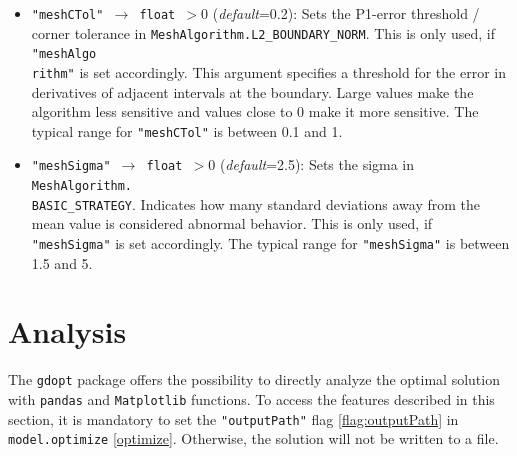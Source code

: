 \documentclass[12pt]{article}
\begin{document}
\begin{mdframed}[backgroundcolor=gray!10, roundcorner=10pt,
		linewidth=1pt]
\begin{itemize}
		      \label{flag:meshCTol}
		\item \texttt{"meshCTol" $\rightarrow$ float $> 0$}
		      (\emph{default}=0.2): Sets the P1-error threshold / corner tolerance in
		      \texttt{MeshAlgorithm.L2\_BOUNDARY\_NORM}. This is only used, if
		      \texttt{"meshAlgo\\rithm"} is set accordingly. This argument specifies a
		      threshold for the error in derivatives of adjacent intervals at the boundary.
		      Large values make the algorithm less sensitive and values close to 0 make it
		      more sensitive.
		      The typical range for \texttt{"meshCTol"} is between 0.1 and 1.

		      \label{flag:meshSigma}
		\item \texttt{"meshSigma" $\rightarrow$ float $> 0$}
		      (\emph{default}=2.5): Sets the sigma in
		      \texttt{MeshAlgorithm.\\BASIC\_STRATEGY}. Indicates how many standard
		      deviations away from the mean value is considered abnormal behavior. This is
		      only used, if \texttt{"meshSigma"} is set accordingly.
		      The typical range for \texttt{"meshSigma"} is between 1.5 and 5.

	\end{itemize}

\end{mdframed}

\section{Analysis}
\label{c:Analysis}
The \texttt{gdopt} package offers the possibility to directly analyze the optimal solution with  \texttt{pandas} and \texttt{Matplotlib} functions. To access the features described in this section, it is mandatory to set the \texttt{"outputPath"} flag \eqref{flag:outputPath} in \texttt{model.optimize} \eqref{optimize}. Otherwise, the solution will not be written to a file.
\end{document}

